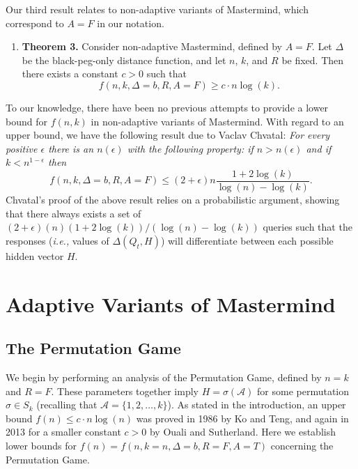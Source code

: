 \documentclass[12pt, a4paper]{article}
\begin{document}
Our third result relates to non-adaptive variants of Mastermind, which correspond to $A=F$ in our notation.
\begin{enumerate}[label=]
	\item\textbf{Theorem 3.} Consider non-adaptive Mastermind, defined by $A=F$. Let $\Delta$ be the black-peg-only distance function, and let $n$, $k$, and $R$ be fixed. Then there exists a constant $c>0$ such that
	\begin{equation*}
		f(n, k, \Delta = b, R, A=F)\ge c\cdot n\log(k).
	\end{equation*}
\end{enumerate}
To our knowledge, there have been no previous attempts to provide a lower bound for $f(n,k)$ in non-adaptive variants of Mastermind. With regard to an upper bound, we have the following result due to Vaclav Chvatal:\cite{VC83} \textit{For every positive $\epsilon$ there is an $n(\epsilon)$ with the following property: if $n>n(\epsilon)$ and if $k<n^{1-\epsilon}$ then}
\begin{equation*}
	f(n, k, \Delta = b, R, A=F)\le (2 + \epsilon)n\frac{1+2\log(k)}{\log(n) - \log(k)}.	
\end{equation*}
Chvatal's proof of the above result relies on a probabilistic argument, showing that there always exists a set of $(2 + \epsilon)(n)(1+2\log(k))/(\log(n) - \log(k))$ queries such that the responses (\textit{i.e.,} values of $\Delta(Q_t, H)$) will differentiate between each possible hidden vector $H$.

\section{Adaptive Variants of Mastermind}
\subsection{The Permutation Game}
We begin by performing an analysis of the Permutation Game, defined by $n=k$ and $R=F$. These parameters together imply $H=\sigma(\mathcal{A})$ for some permutation $\sigma\in S_k$ (recalling that $\mathcal{A}=\{1,2,\ldots, k\}$). As stated in the introduction, an upper bound $f(n)\le c\cdot n\log(n)$ was proved in 1986 by Ko and Teng, and again in 2013 for a smaller constant $c>0$ by Ouali and Sutherland. Here we establish lower bounds for $f(n) = f(n, k=n, \Delta=b, R=F, A=T)$ concerning the Permutation Game.
\end{document}
